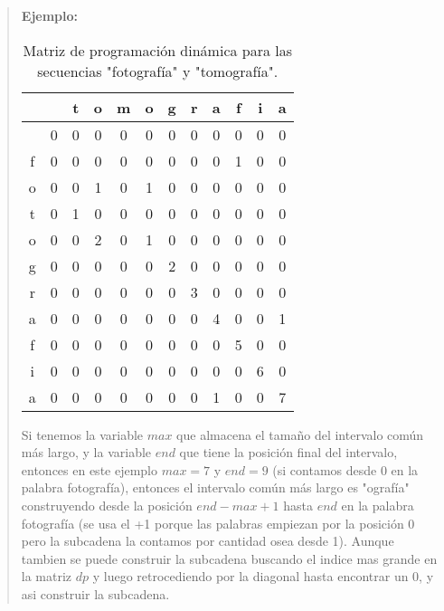 \begin{quote}
    \textbf{Ejemplo:} \vspace{.2cm}
    \begin{table}[H]
        \centering
        \renewcommand{\arraystretch}{1.5}
        \setlength{\tabcolsep}{8pt}
        \begin{tabular}{|c|c|c|c|c|c|c|c|c|c|c|c|}
        \hline
            & & t & o & m & o & g & r & a & f & i & a \\ \hline
          & 0 & 0 & 0 & 0 & 0 & 0 & 0 & 0 & 0 & 0 & 0 \\ \hline
        f & 0 & 0 & 0 & 0 & 0 & 0 & 0 & 0 & 1 & 0 & 0 \\ \hline
        o & 0 & 0 & 1 & 0 & 1 & 0 & 0 & 0 & 0 & 0 & 0 \\ \hline
        t & 0 & 1 & 0 & 0 & 0 & 0 & 0 & 0 & 0 & 0 & 0 \\ \hline
        o & 0 & 0 & 2 & 0 & 1 & 0 & 0 & 0 & 0 & 0 & 0 \\ \hline
        g & 0 & 0 & 0 & 0 & 0 & 2 & 0 & 0 & 0 & 0 & 0 \\ \hline
        r & 0 & 0 & 0 & 0 & 0 & 0 & 3 & 0 & 0 & 0 & 0 \\ \hline
        a & 0 & 0 & 0 & 0 & 0 & 0 & 0 & 4 & 0 & 0 & 1 \\ \hline
        f & 0 & 0 & 0 & 0 & 0 & 0 & 0 & 0 & 5 & 0 & 0 \\ \hline
        i & 0 & 0 & 0 & 0 & 0 & 0 & 0 & 0 & 0 & 6 & 0 \\ \hline
        a & 0 & 0 & 0 & 0 & 0 & 0 & 0 & 1 & 0 & 0 & 7 \\ \hline
        \end{tabular}
        \caption{Matriz de programación dinámica para las secuencias "fotografía" y "tomografía".}
    \end{table}

    Si tenemos la variable $max$ que almacena el tamaño del intervalo común más largo, y la variable $end$ que tiene la posición final del intervalo, entonces en este ejemplo $max = 7$ y $end = 9$ (si contamos desde 0 en la palabra fotografía), entonces el intervalo común más largo es "ografía" construyendo desde la posición $end - max +1$ hasta $end$ en la palabra fotografía (se usa el +1 porque las palabras empiezan por la posición 0 pero la subcadena la contamos por cantidad osea desde 1). Aunque tambien se puede construir la subcadena buscando el indice mas grande en la matriz $dp$ y luego retrocediendo por la diagonal hasta encontrar un 0, y asi construir la subcadena. \vspace{.2cm} 
\end{quote}